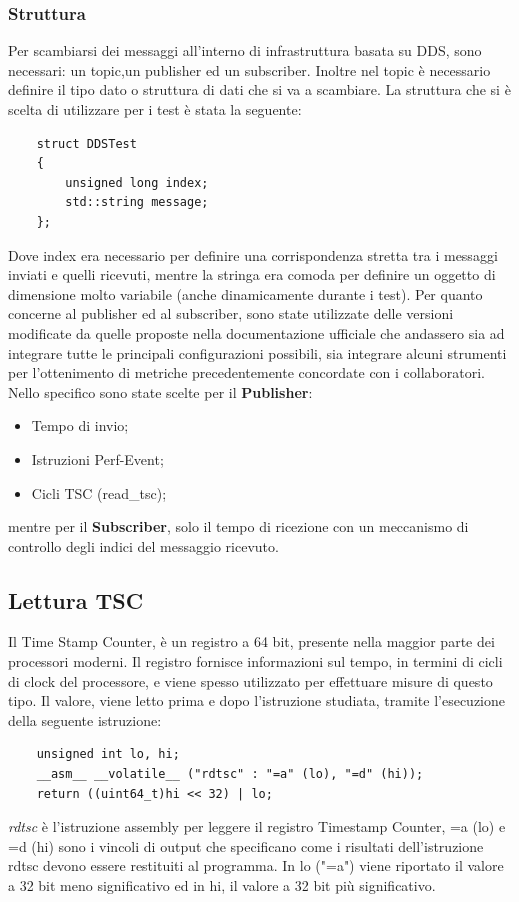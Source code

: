\subsubsection*{Struttura}

Per scambiarsi dei messaggi all'interno di infrastruttura basata su DDS, sono necessari: un topic,un publisher ed un subscriber. Inoltre nel topic è necessario definire il tipo dato o struttura di dati che si va a scambiare. La struttura che si è scelta di utilizzare per i test è stata la seguente:
\begin{verbatim}
    struct DDSTest
    {
        unsigned long index;
        std::string message;
    };
\end{verbatim}
Dove index era necessario per definire una corrispondenza stretta tra i messaggi inviati e quelli ricevuti, mentre la stringa era comoda per definire un oggetto di dimensione molto variabile (anche dinamicamente durante i test).
Per quanto concerne al publisher ed al subscriber, sono state utilizzate delle versioni modificate da quelle proposte nella documentazione ufficiale \cite{FastDDS} che andassero sia ad integrare tutte le principali configurazioni possibili, sia integrare alcuni strumenti per l'ottenimento di metriche precedentemente concordate con i collaboratori. Nello specifico sono state scelte per il \textbf{Publisher}:
\begin{itemize}
    \item Tempo di invio;
    \item Istruzioni Perf-Event;
    \item Cicli TSC (read\_tsc);
\end{itemize}
mentre per il \textbf{Subscriber}, solo il tempo di ricezione con un meccanismo di controllo degli indici del messaggio ricevuto.
\subsection{Lettura TSC}
Il Time Stamp Counter, è un registro a 64 bit, presente nella maggior parte dei processori moderni. Il registro fornisce informazioni sul tempo, in termini di cicli di clock del processore, e viene spesso utilizzato per effettuare misure di questo tipo. Il valore, viene letto prima e dopo l'istruzione studiata, tramite l'esecuzione della seguente istruzione:
\begin{verbatim}
    unsigned int lo, hi;
    __asm__ __volatile__ ("rdtsc" : "=a" (lo), "=d" (hi));
    return ((uint64_t)hi << 32) | lo; 
\end{verbatim}
\emph{rdtsc} è l'istruzione assembly per leggere il registro Timestamp Counter, =a (lo) e =d (hi) sono i vincoli di output che specificano come i risultati dell'istruzione rdtsc devono essere restituiti al programma. In lo ("=a") viene riportato il valore a 32 bit meno significativo ed in hi, il valore a 32 bit più significativo.

